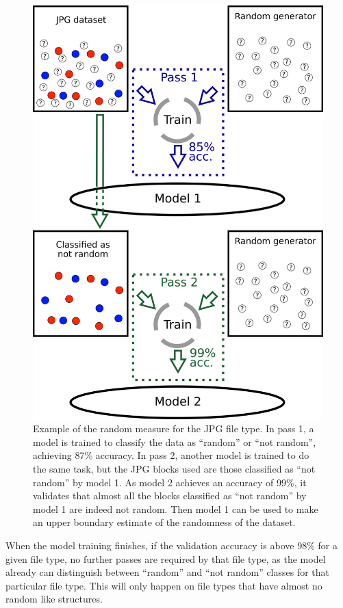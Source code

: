 \noindent
\begin{figure}[htb!]
\centering\includegraphics[width=1.0\textwidth]{content/random_measure.png}
\caption{\label{fig:randommeasure}Example of the random measure for the JPG file type. In pass 1, a model is trained to classify the data as ``random'' or ``not random'', achieving 87\% accuracy. In pass 2, another model is trained to do the same task, but the JPG blocks used are those classified as ``not random'' by model 1. As model 2 achieves an accuracy of 99\%, it validates that almost all the blocks classified as ``not random'' by model 1 are indeed not random. Then model 1 can be used to make an upper boundary estimate of the randomness of the dataset.}%
\end{figure}

When the model training finishes, if the validation accuracy is above 98\% for a given file type, no further passes are required by that file type, as the model already can distinguish between ``random'' and ``not random'' classes for that particular file type. This will only happen on file types that have almost no random like structures.

